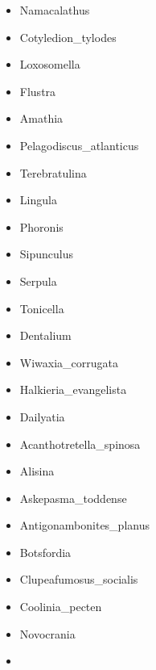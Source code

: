 \documentclass[openany]{book}
\providecommand{\tightlist}{%
  \setlength{\itemsep}{0pt}\setlength{\parskip}{0pt}}
\theoremstyle{definition}
\theoremstyle{definition}
\theoremstyle{definition}
\theoremstyle{remark}
\begin{document}
\begin{itemize}
\tightlist
\item
  Namacalathus\\
\item
  Cotyledion\_tylodes\\
\item
  Loxosomella\\
\item
  Flustra\\
\item
  Amathia\\
\item
  Pelagodiscus\_atlanticus\\
\item
  Terebratulina\\
\item
  Lingula\\
\item
  Phoronis\\
\item
  Sipunculus\\
\item
  Serpula\\
\item
  Tonicella\\
\item
  Dentalium\\
\item
  Wiwaxia\_corrugata\\
\item
  Halkieria\_evangelista\\
\item
  Dailyatia\\
\item
  Acanthotretella\_spinosa\\
\item
  Alisina\\
\item
  Askepasma\_toddense\\
\item
  Antigonambonites\_planus\\
\item
  Botsfordia\\
\item
  Clupeafumosus\_socialis\\
\item
  Coolinia\_pecten\\
\item
  Novocrania\\
\item

\end{itemize}
\end{document}
